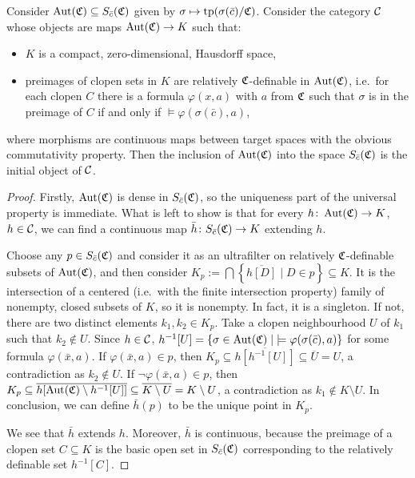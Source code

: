 	\begin{prop}\label{proposition: category C}
		Consider $\operatorname{{Aut}}({\mathfrak C})\subseteq S_{\bar c}({\mathfrak C})$ given by $\sigma \mapsto \operatorname{{tp}}(\sigma(\bar c)/{\mathfrak C})$.
		Consider the category ${\mathcal C}$ whose objects are maps $\operatorname{{Aut}}({\mathfrak C})\to K$ such that:
		\begin{itemize}
			\item
			$K$ is a compact, zero-dimensional, Hausdorff space,
			\item
			preimages of clopen sets in $K$ are relatively ${\mathfrak C}$-definable in $\operatorname{{Aut}}({\mathfrak C})$, i.e.\ for each clopen $C$ there is a formula $\varphi(x,a)$ with $a$ from ${\mathfrak C}$ such that $\sigma$ is in the preimage of $C$ if and only if $\models \varphi(\sigma(\bar c),a)$,
		\end{itemize}
		where morphisms are continuous maps between target spaces with the obvious commutativity property.
		Then the inclusion of $\operatorname{{Aut}}({\mathfrak C})$ into the space $S_{\bar c}({\mathfrak C})$ is the initial object of ${\mathcal C}$.
	\end{prop}
	\begin{proof}
		Firstly, $\operatorname{{Aut}}({\mathfrak C})$ is dense in $S_{\bar c}({\mathfrak C})$, so the uniqueness part of the universal property is immediate. What is left to show is that for every $h\colon \operatorname{{Aut}}({\mathfrak C})\to K$, $h\in {\mathcal C}$, we can find a continuous map $\bar h\colon S_{\bar c}({\mathfrak C})\to K$ extending $h$.
		
		Choose any $p\in S_{\bar c}({\mathfrak C})$ and consider it as an ultrafilter
		on relatively ${\mathfrak C}$-definable subsets of $\operatorname{{Aut}}({\mathfrak C})$, and then consider $K_p:=\bigcap \left\{\overline{h[D]}\mid D\in p\right\}\subseteq K$.
		It is the intersection of a centered (i.e.\ with the finite intersection property) family of nonempty, closed subsets of $K$, so it is nonempty. In fact, it is a singleton.
		If not, there are two distinct elements $k_1,k_2 \in K_p$. Take a clopen neighbourhood $U$ of $k_1$ such that $k_2 \notin U$. Since $h \in {\mathcal C}$, $h^{-1}[U]= \{\sigma \in \operatorname{{Aut}}({\mathfrak C}) \mid \;\models \varphi(\sigma(\bar c),a)\}$ for some formula $\varphi(\bar x, a)$. If $\varphi(\bar x, a) \in p$, then $K_p \subseteq \overline{h[h^{-1}[U]]} \subseteq \overline{U}=U$, a contradiction as $k_2 \notin U$. If $\neg \varphi(\bar x, a) \in p$, then $K_p \subseteq \overline{h[\operatorname{{Aut}}({\mathfrak C}) \setminus h^{-1}[U]]} \subseteq \overline{K \setminus U}=K \setminus U$, a contradiction as $k_1 \notin K \setminus U$.
		In conclusion, we can define $\bar h(p)$ to be the unique point in $K_p$.
		
		We see that $\bar h$ extends $h$. Moreover, $\bar h$ is continuous, because the preimage of a clopen set $C\subseteq K$ is the basic open set in $S_{\bar c}({\mathfrak C})$ corresponding to the relatively definable set $h^{-1}[C]$.
	\end{proof}
	
